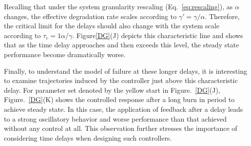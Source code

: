 \documentclass[12pt]{iopart}
\begin{document}
\brian[What are the units of tau in Figure5?  This section is confusing in that it is not clear to me how tau and gamma are changing relative to one another when alpha is changed. From Eq 21 it seems that gamma changes with 1/alpha.  If this is correct, does that mean that the critical time changes with $\tau_c = 1/gamma = alpha/gamma ~= 5*alpha$?  If you plot that as a thick dashed dark line in Figure5J,  would it match to the contours? ] \michael[$tc=1/(0.7*alpha)$ matches the counters well]

Recalling that under the system granularity rescaling (Eq.\ \ref{eq:rescaling}), as $\alpha$ changes, the effective degradation rate scales according to $\gamma' = \gamma/\alpha$.  Therefore, the critical limit for the delays should also change with the system scale according to $\tau_c = 1\alpha/\gamma$. Figure\ref{DG}(J) depicts this characteristic line and shows that as the time delay approaches and then exceeds this level, the steady state performance become dramatically worse.  

Finally, to understand the model of failure at these longer delays, it is interesting to examine trajectories induced by the controller just above this characteristic delay. For parameter set denoted by the yellow start in Figure.\ \ref {DG}(J), Figure.\ \ref {DG}(K) shows the controlled response after a long burn in period to achieve steady state. In this case, the application of feedback after a delay leads to a strong oscillatory behavior and worse performance than that achieved without any control at all. This observation further stresses the importance of considering time delays when designing such controllers.
\end{document}
